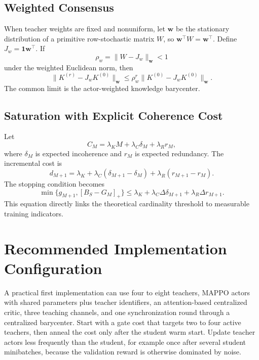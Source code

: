 \documentclass[10pt,twocolumn,a4paper]{article}
\newcommand{\ind}{\mathbf{1}}
\begin{document}
\subsection{Weighted Consensus}

When teacher weights are fixed and nonuniform, let \(\bm w\) be the stationary distribution of a primitive row-stochastic matrix \(W\), so \(\bm w^\top W=\bm w^\top\). Define \(J_w=\ind\bm w^\top\). If
\begin{equation}
 \rho_w=\|W-J_w\|_{\bm w}<1
\end{equation}
under the weighted Euclidean norm, then
\begin{equation}
 \|K^{(r)}-J_wK^{(0)}\|_{\bm w}
 \le\rho_w^r\|K^{(0)}-J_wK^{(0)}\|_{\bm w}.
\end{equation}
The common limit is the actor-weighted knowledge barycenter.

\subsection{Saturation with Explicit Coherence Cost}

Let
\begin{equation}
 C_M=\lambda_KM+\lambda_C\delta_M+\lambda_R r_M,
\end{equation}
where \(\delta_M\) is expected incoherence and \(r_M\) is expected redundancy. The incremental cost is
\begin{equation}
 d_{M+1}=\lambda_K+\lambda_C(\delta_{M+1}-\delta_M)
 +\lambda_R(r_{M+1}-r_M).
\end{equation}
The stopping condition becomes
\begin{equation}
 \min\{g_{M+1},[B_S-G_M]_+\}
 \le\lambda_K+\lambda_C\Delta\delta_{M+1}+\lambda_R\Delta r_{M+1}.
\label{eq:explicitstop}
\end{equation}
This equation directly links the theoretical cardinality threshold to measurable training indicators.

\section{Recommended Implementation Configuration}

A practical first implementation can use four to eight teachers, MAPPO actors with shared parameters plus teacher identifiers, an attention-based centralized critic, three teaching channels, and one synchronization round through a centralized barycenter. Start with a gate cost that targets two to four active teachers, then anneal the cost only after the student warm start. Update teacher actors less frequently than the student, for example once after several student minibatches, because the validation reward is otherwise dominated by noise.
\end{document}
